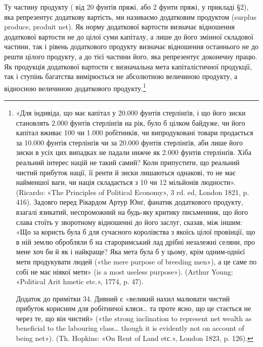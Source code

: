 Ту частину продукту ( від 20 фунтів пряжі, або 2 фунти пряжі, у прикладі §2), яка репрезентує
додаткову вартість, ми
називаємо додатковим продуктом (surplus produce, produit net). Як норму додаткової вартости визначає
відношення додаткової
вартости не до цілої суми капіталу, а лише до його змінної складової частини, так і рівень
додаткового продукту визначає відношення останнього не до решти цілого продукту, а до тієї частини
його, яка репрезентує доконечну працю. Як продукція додаткової вартости є визначальна мета
капіталістичної продукції, так і ступінь багатства вимірюється не абсолютною величиною
продукту, а відносною величиною додаткового продукту.\footnote{
«Для індивіда, що має капітал у 20.000 фунтів стерлінґів, і що його зиски становлять 2.000 фунтів
стерлінґів на рік, було б цілком байдуже, чи його капітал вживає 100 чи 1.000 робітників, чи
випродуковані товари продається за 10.000 фунтів стерлінґів чи за 20.000 фунтів стерлінґів, аби лише
його зиски в усіх цих випадках не падали нижче як 2.000 фунтів
стерлінґів. Хіба реальний інтерес націй не такий самий? Коли припустити, що реальний чистий прибуток
нації, її ренти й зиски лишаються однакові, то не має найменшої ваги, чи нація складається з 10 чи
12 мільйонів людности». (Ricardo: «The Principles of Political Economy», 3 rd. ed, London 1821, p.
416). Задовго перед Рікардом Артур Юнґ, фанатик додаткового продукту, взагалі язикатий, неспроможний
на будь-яку критику письменник, що його слава стоїть у зворотному відношенні
до його заслуг, сказав, між іншим: «Що за користь була б для сучасного королівства з якоїсь цілої
провінції, що в ній землю обробляли б на староримський лад дрібні незалежні селяни, про мене хоч би
й як і найкраще? Яка мета була б у цьому, крім одним-однієї мети продукувати людей
(«the mere purpose of breeding men»), а це саме по собі не має ніякої мети» (is a most useless
purpose»). (Arthur Young: «Political Arit hmetic etc.», 1774, p. 47).

Додаток до примітки 34. Дивний є «великий нахил малювати чистий прибуток корисним для робітничої
кляси\dots{} та проте ясно, що це стається не через те, що він чистий» («the strong inclination to
represent net wealth as beneficial to the labouring class\dots{} though it is evidently not on account
of being net»). (Th. Hopkins: «On Rent of Land etс.», London 1823, p. 126).
}
